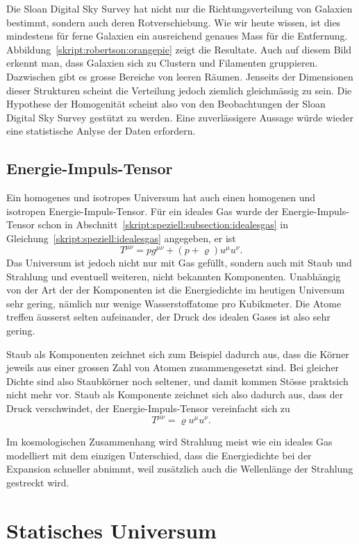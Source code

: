 Die Sloan Digital Sky Survey hat nicht nur die Richtungsverteilung von
Galaxien bestimmt, sondern auch deren Rotverschiebung.
Wie wir heute wissen, ist dies mindestens für ferne Galaxien ein ausreichend
genaues Mass für die Entfernung.
Abbildung~\ref{skript:robertson:orangepie} zeigt die Resultate.
Auch auf diesem Bild erkennt man, dass Galaxien sich zu Clustern
und Filamenten gruppieren.
Dazwischen gibt es grosse Bereiche von leeren Räumen.
Jenseits der Dimensionen dieser Strukturen scheint die Verteilung jedoch
ziemlich gleichmässig zu sein.
Die Hypothese der Homogenität scheint also von den Beobachtungen der
Sloan Digital Sky Survey gestützt zu werden.
Eine zuverlässigere Aussage würde wieder eine statistische Anlyse der 
Daten erfordern.

\subsection{Energie-Impuls-Tensor}
Ein homogenes und isotropes Universum hat auch einen homogenen
und isotropen Energie-Impuls-Tensor.
Für ein ideales Gas wurde der Energie-Impuls-Tensor schon in
Abschnitt~\ref{skript:speziell:subsection:idealesgas}
in Gleichung~\eqref{skript:speziell:idealesgas} angegeben, er ist
\[
T^{\mu\nu} = pg^{\mu\nu} + (p+\varrho)u^\mu u^\nu.
\]
Das Universum ist jedoch nicht nur mit Gas gefüllt, sondern auch
mit Staub und Strahlung und eventuell weiteren, nicht bekannten
Komponenten.
Unabhängig von der Art der der Komponenten ist die Energiedichte
im heutigen Universum sehr gering, nämlich nur wenige Wasserstoffatome
pro Kubikmeter.
Die Atome treffen äusserst selten aufeinander,
der Druck des idealen Gases ist also sehr gering.

Staub als Komponenten zeichnet sich zum Beispiel dadurch aus, dass die Körner
jeweils aus einer grossen Zahl von Atomen zusammengesetzt sind.
Bei gleicher Dichte sind also Staubkörner noch seltener, und damit kommen
Stösse praktsich nicht mehr vor.
Staub als Komponente zeichnet sich also dadurch aus, dass der Druck
verschwindet, der Energie-Impuls-Tensor vereinfacht sich zu
\[
T^{\mu\nu}
=
\varrho u^\mu u^\nu.
\]

Im kosmologischen Zusammenhang wird Strahlung meist wie ein
ideales Gas modelliert mit dem einzigen Unterschied, dass
die Energiedichte bei der Expansion schneller abnimmt, weil
zusätzlich auch die Wellenlänge der Strahlung gestreckt wird.

\section{Statisches Universum}

